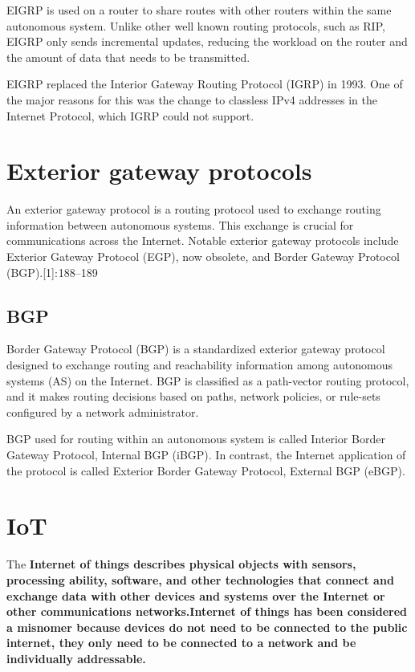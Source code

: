 \documentclass[a4paper,12pt]{article}
\begin{document}
EIGRP is used on a router to share routes with other routers within the same autonomous system. Unlike other well known routing protocols, such as RIP, EIGRP only sends incremental updates, reducing the workload on the router and the amount of data that needs to be transmitted.

EIGRP replaced the Interior Gateway Routing Protocol (IGRP) in 1993. One of the major reasons for this was the change to classless IPv4 addresses in the Internet Protocol, which IGRP could not support.

\section{Exterior gateway protocols}

An exterior gateway protocol is a routing protocol used to exchange routing information between autonomous systems. This exchange is crucial for communications across the Internet. Notable exterior gateway protocols include Exterior Gateway Protocol (EGP), now obsolete, and Border Gateway Protocol (BGP).[1]: 188–189 

\subsection{BGP}
Border Gateway Protocol (BGP) is a standardized exterior gateway protocol designed to exchange routing and reachability information among autonomous systems (AS) on the Internet. BGP is classified as a path-vector routing protocol, and it makes routing decisions based on paths, network policies, or rule-sets configured by a network administrator.

BGP used for routing within an autonomous system is called Interior Border Gateway Protocol, Internal BGP (iBGP). In contrast, the Internet application of the protocol is called Exterior Border Gateway Protocol, External BGP (eBGP).

\section{IoT}
The \bf{Internet of things} describes physical objects with sensors, processing ability, software, and other technologies that connect and exchange data with other devices and systems over the Internet or other communications networks.Internet of things has been considered a misnomer because devices do not need to be connected to the public internet, they only need to be connected to a network and be individually addressable.
\end{document}
